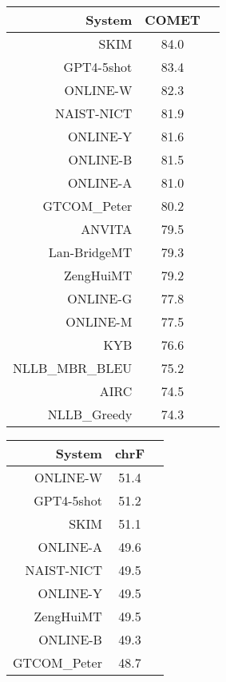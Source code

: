 \documentclass[11pt]{article}
\begin{document}
\begin{table}  
\scriptsize
\begin{subtable}[t]{0.33\textwidth}
\begin{tabular}{rcc}
\toprule 
System  & COMET \\ 
\midrule 
SKIM  & 84.0 \\ 
\rowcolor{ashgrey} GPT4-5shot  & 83.4 \\ 
\rowcolor{ashgrey} ONLINE-W  & 82.3 \\ 
NAIST-NICT  & 81.9 \\ 
\rowcolor{ashgrey} ONLINE-Y  & 81.6 \\ 
\rowcolor{ashgrey} ONLINE-B  & 81.5 \\ 
\rowcolor{ashgrey} ONLINE-A  & 81.0 \\ 
\rowcolor{ashgrey} GTCOM\_Peter  & 80.2 \\ 
ANVITA & 79.5 \\ 
\rowcolor{ashgrey} Lan-BridgeMT  & 79.3 \\ 
\rowcolor{ashgrey} ZengHuiMT  & 79.2 \\ 
\rowcolor{ashgrey} ONLINE-G  & 77.8 \\ 
\rowcolor{ashgrey} ONLINE-M  & 77.5 \\ 
\rowcolor{ashgrey} KYB  & 76.6 \\ 
\rowcolor{ashgrey} NLLB\_MBR\_BLEU  & 75.2 \\ 
AIRC &  74.5 \\ 
\rowcolor{ashgrey} NLLB\_Greedy  & 74.3 \\ 
\bottomrule 
\end{tabular} 
\end{subtable} 
\begin{subtable}[t]{0.33\textwidth}
\begin{tabular}{rcc}
\toprule 
System  & chrF \\ 
\midrule 
\rowcolor{ashgrey} ONLINE-W  & 51.4 \\ 
\rowcolor{ashgrey} GPT4-5shot  & 51.2 \\ 
SKIM  & 51.1 \\ 
\rowcolor{ashgrey} ONLINE-A  & 49.6 \\ 
NAIST-NICT  & 49.5 \\ 
\rowcolor{ashgrey} ONLINE-Y  & 49.5 \\ 
\rowcolor{ashgrey} ZengHuiMT  & 49.5 \\ 
\rowcolor{ashgrey} ONLINE-B  & 49.3 \\ 
\rowcolor{ashgrey} GTCOM\_Peter  & 48.7 \\ 

\end{tabular}
\end{subtable}
\end{table}
\end{document}
